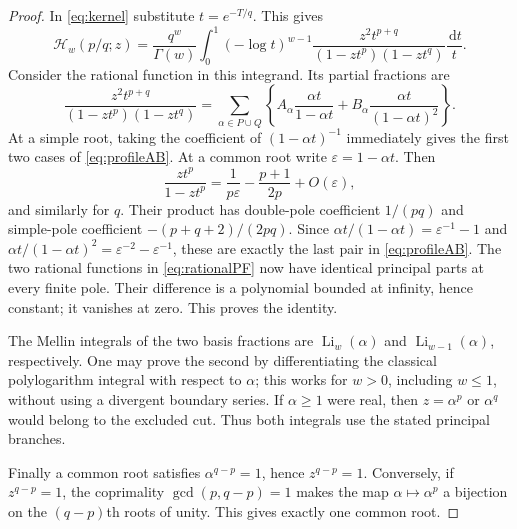 \documentclass[11pt]{article}
\numberwithin{equation}{section}
\theoremstyle{definition}\newtheorem{definition}[theorem]{Definition}
\theoremstyle{remark}\newtheorem{remark}[theorem]{Remark}
\DeclareMathOperator{\Li}{Li}
\newcommand{\dd}{\,\mathrm d}
\newcommand{\HH}{\mathcal H}
\begin{document}
\begin{proof}
In \eqref{eq:kernel} substitute $t=e^{-T/q}$. This gives
\begin{equation}\label{eq:profileMellin}
 \HH_w(p/q;z)=\frac{q^w}{\Gamma(w)}\int_0^1
 (-\log t)^{w-1}\frac{z^2t^{p+q}}{(1-zt^p)(1-zt^q)}\frac{\dd t}{t}.
\end{equation}
Consider the rational function in this integrand. Its partial
fractions are
\begin{equation}\label{eq:rationalPF}
 \frac{z^2t^{p+q}}{(1-zt^p)(1-zt^q)}
 =\sum_{\alpha\in P\cup Q}
 \left\{A_\alpha\frac{\alpha t}{1-\alpha t}
       +B_\alpha\frac{\alpha t}{(1-\alpha t)^2}\right\}.
\end{equation}
At a simple root, taking the coefficient of $(1-\alpha t)^{-1}$
immediately gives the first two cases of \eqref{eq:profileAB}.
At a common root write $\varepsilon=1-\alpha t$. Then
\[
 \frac{zt^p}{1-zt^p}
 =\frac1{p\varepsilon}-\frac{p+1}{2p}+O(\varepsilon),
\]
and similarly for $q$. Their product has double-pole coefficient
$1/(pq)$ and simple-pole coefficient $-(p+q+2)/(2pq)$.
Since $\alpha t/(1-\alpha t)=\varepsilon^{-1}-1$ and
$\alpha t/(1-\alpha t)^2=\varepsilon^{-2}-\varepsilon^{-1}$,
these are exactly the last pair in \eqref{eq:profileAB}.
The two rational functions in \eqref{eq:rationalPF} now have identical
principal parts at every finite pole. Their difference is a
polynomial bounded at infinity, hence constant; it vanishes at zero.
This proves the identity.

The Mellin integrals of the two basis fractions are $\Li_w(\alpha)$
and $\Li_{w-1}(\alpha)$, respectively. One may prove the second by
differentiating the classical polylogarithm integral with respect to
$\alpha$; this works for $w>0$, including $w\le1$, without using a
divergent boundary series. If $\alpha\ge1$ were real, then
$z=\alpha^p$ or $\alpha^q$ would belong to the excluded cut.
Thus both integrals use the stated principal branches.

Finally a common root satisfies $\alpha^{q-p}=1$, hence
$z^{q-p}=1$. Conversely, if $z^{q-p}=1$, the coprimality
$\gcd(p,q-p)=1$ makes the map $\alpha\mapsto\alpha^p$ a bijection on
the $(q-p)$th roots of unity. This gives exactly one common root.
\end{proof}
\end{document}
